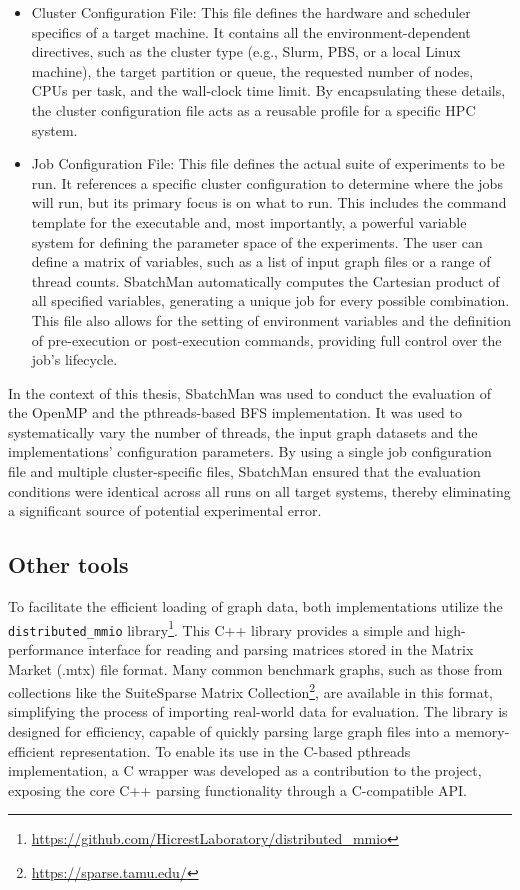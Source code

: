 \begin{itemize}
    \item Cluster Configuration File: This file defines the hardware and scheduler specifics of a target machine. It contains all the environment-dependent directives, such as the cluster type (e.g., Slurm, PBS, or a local Linux machine), the target partition or queue, the requested number of nodes, CPUs per task, and the wall-clock time limit. By encapsulating these details, the cluster configuration file acts as a reusable profile for a specific HPC system.
    \item Job Configuration File: This file defines the actual suite of experiments to be run. It references a specific cluster configuration to determine where the jobs will run, but its primary focus is on what to run. This includes the command template for the executable and, most importantly, a powerful variable system for defining the parameter space of the experiments. The user can define a matrix of variables, such as a list of input graph files or a range of thread counts. SbatchMan automatically computes the Cartesian product of all specified variables, generating a unique job for every possible combination. This file also allows for the setting of environment variables and the definition of pre-execution or post-execution commands, providing full control over the job's lifecycle.
\end{itemize}
    
In the context of this thesis, SbatchMan was used to conduct the evaluation of the OpenMP and the pthreads-based BFS implementation. It was used to systematically vary the number of threads, the input graph datasets and the implementations' configuration parameters. By using a single job configuration file and multiple cluster-specific files, SbatchMan ensured that the evaluation conditions were identical across all runs on all target systems, thereby eliminating a significant source of potential experimental error.

\subsection{Other tools}
To facilitate the efficient loading of graph data, both implementations utilize the \texttt{distributed\_mmio} library\footnote{\url{https://github.com/HicrestLaboratory/distributed\_mmio}}. This C++ library provides a simple and high-performance interface for reading and parsing matrices stored in the Matrix Market (.mtx) file format. Many common benchmark graphs, such as those from collections like the SuiteSparse Matrix Collection\footnote{\url{https://sparse.tamu.edu/}}, are available in this format, simplifying the process of importing real-world data for evaluation. The library is designed for efficiency, capable of quickly parsing large graph files into a memory-efficient representation. To enable its use in the C-based pthreads implementation, a C wrapper was developed as a contribution to the project, exposing the core C++ parsing functionality through a C-compatible API.

